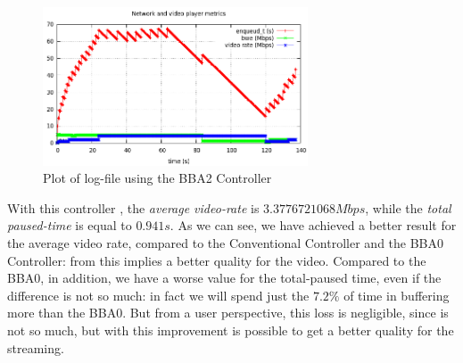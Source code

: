 \documentclass[a4paper]{report}
\begin{document}
\begin{figure}[H]
  \begin{center}
    \includegraphics[width=0.7\textwidth]{bba2plot}
  \end{center}
  \caption{Plot of log-file using the BBA2 Controller}\label{resten}
\end{figure}

With this controller , the \textit{average video-rate} is $3.3776721068 Mbps$, while the \textit{total paused-time} is equal to $0.941 s$.
As we can see, we have achieved a better result for the average video rate, compared to the Conventional Controller and the BBA0 Controller: from this implies a better quality for the video. Compared to the BBA0, in addition, we have a worse value for the total-paused time, even if the difference is not so much: in fact we will spend just the $7.2\%$ of time in buffering more than the BBA0.
But from a user perspective, this loss is negligible, since is not so much, but with this improvement is possible to get a better quality for the streaming.




\end{document}
